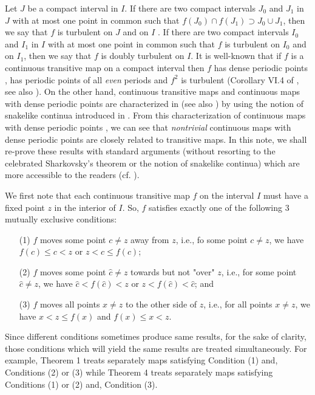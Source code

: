 \documentclass[12pt]{article}
\begin{document}
Let $J$ be a compact interval in $I$.  If there are two compact intervals $J_0$ and $J_1$ in $J$ with at most one point in common such that $f(J_0) \cap f(J_1) \supset J_0 \cup J_1$, then we say that $f$ is turbulent on $J$ and on $I$ {\bf\cite{bc}}.  If there are two compact intervals $I_0$ and $I_1$ in $I$ with at most one point in common such that $f$ is turbulent on $I_0$ and on $I_1$, then we say that $f$ is doubly turbulent on $I$.  It is well-known that if $f$ is a continuous transitive map on a compact interval then $f$ has dense periodic points {\bf\cite{bc, vb}}, has periodic points of all {\it even} periods {\bf\cite{li}} and $f^2$ is turbulent \big(Corollary VI.4 of {\bf\cite{bc}}, see also {\bf{\cite{du2}}}\big).  On the other hand, continuous transitive maps and continuous maps with dense periodic points are characterized in {\bf\cite{barge1, barge2}} \big(see also {\bf\cite{bl}}\big) by using the notion of snakelike continua introduced in {\bf\cite{bing}}.  From this characterization of continuous maps with dense periodic points {\bf\cite{barge1}}, we can see that {\it nontrivial} continuous maps with dense periodic points are closely related to transitive maps.  In this note, we shall re-prove these results with standard arguments (without resorting to the celebrated Sharkovsky's theorem {\bf\cite{sh}} or the notion of snakelike continua\big) which are more accessible to the readers \big(cf. {\bf\cite{ru}}\big). 

We first note that each continuous transitive map $f$ on the interval $I$ must have a fixed point $z$ in the interior of $I$.  So, $f$ satisfies exactly one of the following 3 mutually exclusive conditions: 
\begin{itemize}
\item[{\rm(1)}]
$f$ moves some point $c \ne z$ away from $z$, i.e., fo some point $c \ne z$, we have $f(c) \le c < z$ or $z < c \le f(c)$; 

\item[{\rm(2)}] 
$f$ moves some point $\hat c \ne z$ towards but not "over" $z$, i.e., for some point $\hat c \ne z$, we have $\hat c < f(\hat c) < z$ or $z < f(\hat c) < \hat c$; and 

\item[{\rm (3)}] $f$ moves all points $x \ne z$ to the other side of $z$, i.e., for all points $x \ne z$, we have $x < z \le f(x)$ and $f(x) \le x < z$. \end{itemize}

Since different conditions sometimes produce same results, for the sake of clarity, those conditions which will yield the same results are treated simultaneously.  For example, Theorem 1 treats separately maps satisfying Condition (1) and, Conditions (2) or (3) while Theorem 4 treats separately maps satisfying Conditions (1) or (2) and, Condition (3).  
\end{document}
